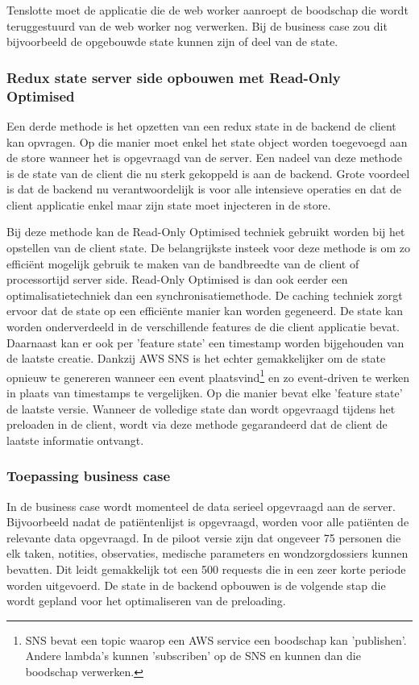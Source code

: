 Tenslotte moet de applicatie die de web worker aanroept de boodschap die wordt teruggestuurd van de web worker nog verwerken. Bij de business case zou dit bijvoorbeeld de opgebouwde state kunnen zijn of deel van de state.

\subsubsection{Redux state server side opbouwen met Read-Only Optimised}
\label{sssec: redux-server-side}
Een derde methode is het opzetten van een redux state in de backend de client kan opvragen. Op die manier moet enkel het state object worden toegevoegd aan de store wanneer het is opgevraagd van de server. Een nadeel van deze methode is de state van de client die nu sterk gekoppeld is aan de backend. Grote voordeel is dat de backend nu verantwoordelijk is voor alle intensieve operaties en dat de client applicatie enkel maar zijn state moet injecteren in de store. 

Bij deze methode kan de Read-Only Optimised techniek gebruikt worden bij het opstellen van de client state. De belangrijkste insteek voor deze methode is om zo effici\"ent mogelijk gebruik te maken van de bandbreedte van de client of processortijd server side. Read-Only Optimised is dan ook eerder een optimalisatietechniek dan een synchronisatiemethode. De caching techniek zorgt ervoor dat de state op een effici\"ente manier kan worden gegeneerd. De state kan worden onderverdeeld in de verschillende features de die client applicatie bevat. Daarnaast kan er ook per 'feature state' een timestamp  worden bijgehouden van de laatste creatie. Dankzij AWS SNS is het echter gemakkelijker om de state opnieuw te genereren wanneer een event plaatsvind\footnote{SNS bevat een topic waarop een AWS service een boodschap kan 'publishen'. Andere lambda's kunnen 'subscriben' op de SNS en kunnen dan die boodschap verwerken.} en zo event-driven te werken in plaats van timestamps te vergelijken. Op die manier bevat elke 'feature state' de laatste versie. Wanneer de volledige state dan wordt opgevraagd tijdens het preloaden in de client, wordt via deze methode gegarandeerd dat de client de laatste informatie ontvangt.

\subsubsection{Toepassing business case}
In de business case wordt momenteel de data serieel opgevraagd aan de server. Bijvoorbeeld nadat de pati\"entenlijst is opgevraagd, worden voor alle pati\"enten de relevante data opgevraagd. In de piloot versie zijn dat ongeveer 75 personen die elk taken, notities, observaties, medische parameters en wondzorgdossiers kunnen bevatten. Dit leidt gemakkelijk tot een 500 requests die in een zeer korte periode worden uitgevoerd. De state in de backend opbouwen is de volgende stap die wordt gepland voor het optimaliseren van de preloading. 

